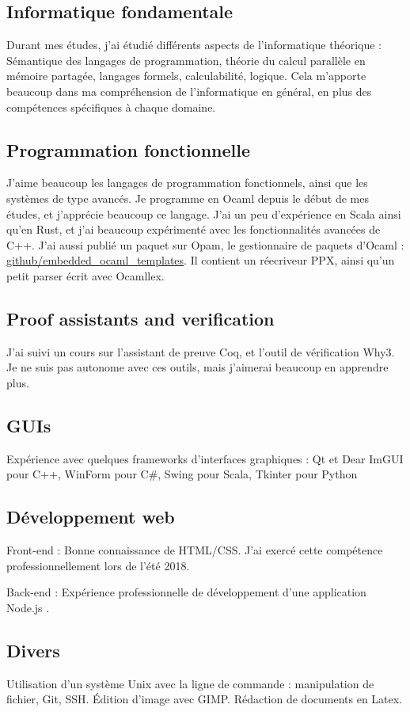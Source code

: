 \documentclass[10pt, a4paper, roman, french]{moderncv}
\begin{document}
	
		\subsection{Informatique fondamentale}
			Durant mes études, j'ai étudié différents aspects de l'informatique théorique :
Sémantique des langages de programmation, théorie du calcul parallèle en mémoire partagée, langages formels, calculabilité, logique.
Cela m'apporte beaucoup dans ma compréhension de l'informatique en général, en plus des compétences spécifiques à chaque domaine.

	
		\subsection{Programmation fonctionnelle}
			J'aime beaucoup les langages de programmation fonctionnels, ainsi que les systèmes de type avancés. Je programme en Ocaml depuis le début de mes études, et j'apprécie beaucoup ce langage. J'ai un peu d'expérience en Scala ainsi qu'en Rust, et j'ai beaucoup expérimenté avec les fonctionnalités avancées de C++.
J'ai aussi publié un paquet sur Opam, le gestionnaire de paquets d'Ocaml : \href{https://github.com/EmileTrotignon/embedded\_ocaml\_templates}{github/embedded\_ocaml\_templates}.
Il contient un réecriveur PPX, ainsi qu'un petit parser écrit avec Ocamllex.

	
		\subsection{Proof assistants and verification}
			J'ai suivi un cours sur l'assistant de preuve Coq, et l'outil de vérification Why3. Je ne suis pas autonome avec ces outils, mais j'aimerai beaucoup en apprendre plus.

	
		\subsection{GUIs}
			Expérience avec quelques frameworks d'interfaces graphiques :
Qt et Dear ImGUI pour C++, WinForm pour C\#, Swing pour Scala, Tkinter pour Python

	
		\subsection{Développement web}
			Front-end : Bonne connaissance de HTML/CSS. J'ai exercé cette compétence professionnellement lors de l'été 2018.

Back-end : Expérience professionnelle de développement d'une application Node.js .

	
		\subsection{Divers}
			Utilisation d'un système Unix avec la ligne de commande : manipulation de fichier, Git, SSH.
Édition d'image avec GIMP.
Rédaction de documents en Latex.

	
\end{document}

